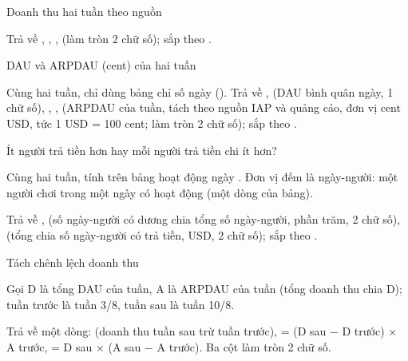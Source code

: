 \documentclass[11pt,a4paper]{article}
\begin{document}
\begin{cauhoi}[ma=jelly-c8-doanh-thu-giam-vi-dau, dulieu=jelly, domain=finance,
  hinhthuc=case, cap=hard, diem=50, tacgia={Agent gói 4}, trangthai=review, bokiemtra={public, hidden-1}, thutu=co, saiso=0.01]
\begin{buoc}[ma=b1, diem=10, hinhthuc=write, bang={daily_kpi}]{Doanh thu hai tuần theo nguồn}
\begin{yeucau}
    \item Trả về , , ,  (làm tròn 2 chữ số); sắp theo .
  \end{yeucau}
\end{buoc}
\begin{buoc}[ma=b2, diem=10, hinhthuc=write, bang={daily_kpi}]{DAU và ARPDAU (cent) của hai tuần}
  \begin{yeucau}
    \item Cùng hai tuần, chỉ dùng bảng chỉ số ngày (). Trả về ,  (DAU bình quân ngày, 1 chữ số), , ,  (ARPDAU của tuần, tách theo nguồn IAP và quảng cáo, đơn vị cent USD, tức 1 USD = 100 cent; làm tròn 2 chữ số); sắp theo .
  \end{yeucau}
\end{buoc}
\begin{buoc}[ma=b3, diem=10, hinhthuc=write, bang={player_daily}]{Ít người trả tiền hơn hay mỗi người trả tiền chi ít hơn?}
  \begin{yeucau}
    \item Cùng hai tuần, tính trên bảng hoạt động ngày . Đơn vị đếm là ngày-người: một người chơi trong một ngày có hoạt động (một dòng của bảng).
    \item Trả về ,  (số ngày-người có  dương chia tổng số ngày-người, phần trăm, 2 chữ số),  (tổng  chia số ngày-người có trả tiền, USD, 2 chữ số); sắp theo .
  \end{yeucau}
\end{buoc}
\begin{buoc}[ma=b4, diem=10, hinhthuc=write, bang={daily_kpi}]{Tách chênh lệch doanh thu}
  \begin{yeucau}
    \item Gọi D là tổng DAU của tuần, A là ARPDAU của tuần (tổng doanh thu chia D); tuần trước là tuần 3/8, tuần sau là tuần 10/8.
    \item Trả về một dòng:  (doanh thu tuần sau trừ tuần trước),  = (D sau − D trước) × A trước,  = D sau × (A sau − A trước). Ba cột làm tròn 2 chữ số.

\end{yeucau}
\end{buoc}
\end{cauhoi}
\end{document}
